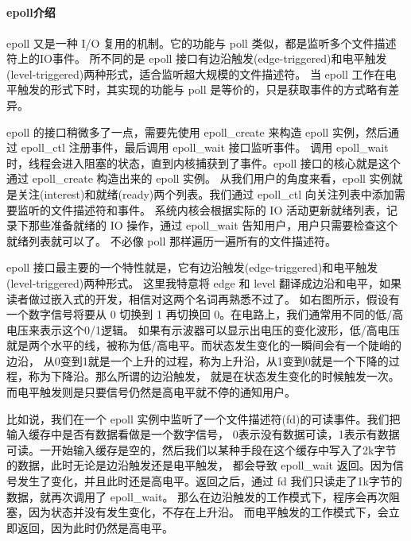 \documentclass[../../../interview-questions.tex]{subfiles}
\begin{document}
\subsection{\color{red}{epoll(Event Poll)原理解析}}

\paragraph{epoll介绍}

epoll 又是一种 I/O 复用的机制。它的功能与 poll 类似，都是监听多个文件描述符上的IO事件。 所不同的是 epoll 接口有边沿触发(edge-triggered)和电平触发(level-triggered)两种形式，适合监听超大规模的文件描述符。 当 epoll 工作在电平触发的形式下时，其实现的功能与 poll 是等价的，只是获取事件的方式略有差异。

epoll 的接口稍微多了一点，需要先使用 epoll\_create 来构造 epoll 实例，然后通过 epoll\_ctl 注册事件，最后调用 epoll\_wait 接口监听事件。 调用 epoll\_wait 时，线程会进入阻塞的状态，直到内核捕获到了事件。epoll 接口的核心就是这个通过 epoll\_create 构造出来的 epoll 实例。 从我们用户的角度来看，epoll 实例就是关注(interest)和就绪(ready)两个列表。我们通过 epoll\_ctl 向关注列表中添加需要监听的文件描述符和事件。 系统内核会根据实际的 IO 活动更新就绪列表，记录下那些准备就绪的 IO 操作，通过 epoll\_wait 告知用户，用户只需要检查这个就绪列表就可以了。 不必像 poll 那样遍历一遍所有的文件描述符。

epoll 接口最主要的一个特性就是，它有边沿触发(edge-triggered)和电平触发(level-triggered)两种形式。 这里我特意将 edge 和 level 翻译成边沿和电平，如果读者做过嵌入式的开发，相信对这两个名词再熟悉不过了。 如右图所示，假设有一个数字信号将要从 0 切换到 1 再切换回 0。在电路上，我们通常用不同的低/高电压来表示这个0/1逻辑。 如果有示波器可以显示出电压的变化波形，低/高电压就是两个水平的线，被称为低/高电平。而状态发生变化的一瞬间会有一个陡峭的边沿， 从0变到1就是一个上升的过程，称为上升沿，从1变到0就是一个下降的过程，称为下降沿。那么所谓的边沿触发， 就是在状态发生变化的时候触发一次。而电平触发则是只要信号仍然是高电平就不停的通知用户。

比如说，我们在一个 epoll 实例中监听了一个文件描述符(fd)的可读事件。我们把输入缓存中是否有数据看做是一个数字信号， 0表示没有数据可读，1表示有数据可读。一开始输入缓存是空的，然后我们以某种手段在这个缓存中写入了2k字节的数据，此时无论是边沿触发还是电平触发， 都会导致 epoll\_wait 返回。因为信号发生了变化，并且此时还是高电平。返回之后，通过 fd 我们只读走了1k字节的数据，就再次调用了 epoll\_wait。 那么在边沿触发的工作模式下，程序会再次阻塞，因为状态并没有发生变化，不存在上升沿。 而电平触发的工作模式下，会立即返回，因为此时仍然是高电平。
\end{document}
